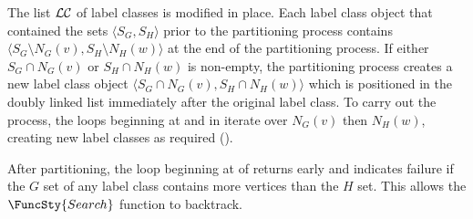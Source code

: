 The list $\mathcal{LC}$ of label classes is modified in place.
Each label class object that contained the sets $\langle S_G, S_H \rangle$ prior
to the partitioning process contains $\langle S_G \setminus N_G(v), S_H \setminus N_H(w)\rangle$
at the end of the partitioning process.
If either $S_G \cap N_G(v)$ or $S_H \cap N_H(w)$
is non-empty, the partitioning process creates a new label class object
$\langle S_G \cap N_G(v), S_H \cap N_H(w)\rangle$ which is
positioned in the doubly linked list immediately after the original label class.
To carry out the process, the loops beginning
at  and 
in  iterate over $N_G(v)$ then $N_H(w)$,
creating new label classes as required ().

After partitioning, the loop beginning at 
of  returns early and indicates failure if the $G$ set
of any label class contains more vertices than the $H$ set.  This allows the
$\FuncSty{Search}$ function to backtrack.

